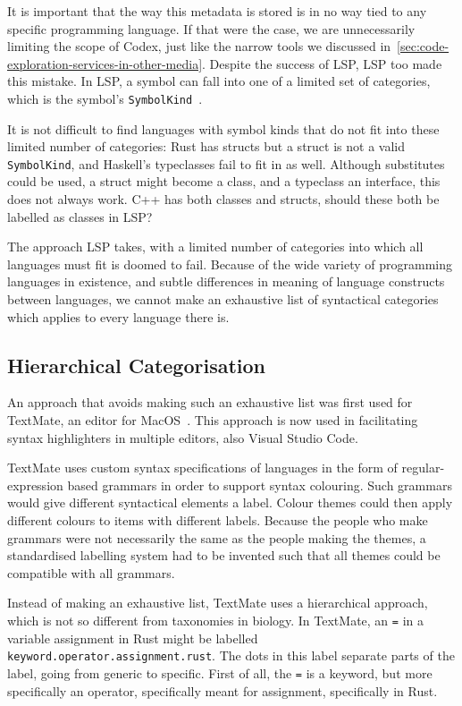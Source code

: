 It is important that the way this metadata is stored is in no way tied to any specific programming language.
If that were the case, we are unnecessarily limiting the scope of Codex, just like the narrow tools we discussed in~\cref{sec:code-exploration-services-in-other-media}.
Despite the success of \ac{LSP}, \ac{LSP} too made this mistake.
In \ac{LSP}, a symbol can fall into one of a limited set of categories, which is the symbol's \texttt{SymbolKind}~\autocite{lsp_symbol_kind}.

It is not difficult to find languages with symbol kinds that do not fit into these limited number of categories: Rust has structs but a struct is not a valid \texttt{SymbolKind}, and Haskell's typeclasses fail to fit in as well.
Although substitutes could be used, a struct might become a class, and a typeclass an interface, this does not always work.
C++ has both classes and structs, should these both be labelled as classes in \ac{LSP}?

The approach \ac{LSP} takes, with a limited number of categories into which all languages must fit is doomed to fail.
Because of the wide variety of programming languages in existence, and subtle differences in meaning of language constructs between languages,
we cannot make an exhaustive list of syntactical categories which applies to every language there is.

\subsection{Hierarchical Categorisation}\label{subsec:hierarchical-categorisation}

An approach that avoids making such an exhaustive list was first used for TextMate, an editor for MacOS~\autocite{textmate}.
This approach is now used in facilitating syntax highlighters in multiple editors, also Visual Studio Code.

TextMate uses custom syntax specifications of languages in the form of regular-expression based grammars in order to support syntax colouring.
Such grammars would give different syntactical elements a label.
Colour themes could then apply different colours to items with different labels.
Because the people who make grammars were not necessarily the same as the people making the themes,
a standardised labelling system had to be invented such that all themes could be compatible with all grammars.

Instead of making an exhaustive list, TextMate uses a hierarchical approach, which is not so different from taxonomies in biology.
In TextMate, an \texttt{=} in a variable assignment in Rust might be labelled \texttt{keyword.operator.assignment.rust}.
The dots in this label separate parts of the label, going from generic to specific.
First of all, the \texttt{=} is a keyword, but more specifically an operator, specifically meant for assignment, specifically in Rust.

